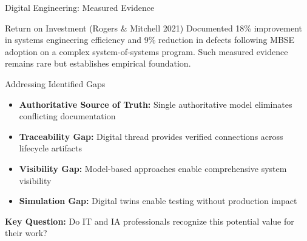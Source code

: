 \documentclass{beamer}
\begin{document}
\begin{frame}[allowframebreaks]{Digital Engineering: Measured Evidence}
  \begin{block}{Return on Investment (Rogers \& Mitchell 2021)}
    Documented 18\% improvement in systems engineering efficiency and 9\% reduction in defects following MBSE adoption on a complex system-of-systems program. Such measured evidence remains rare but establishes empirical foundation.
  \end{block}

  \begin{block}{Addressing Identified Gaps}
    \begin{itemize}
      \item \textbf{Authoritative Source of Truth:} Single authoritative model eliminates conflicting documentation
      \item \textbf{Traceability Gap:} Digital thread provides verified connections across lifecycle artifacts
      \item \textbf{Visibility Gap:} Model-based approaches enable comprehensive system visibility
      \item \textbf{Simulation Gap:} Digital twins enable testing without production impact
    \end{itemize}
  \end{block}

  \vspace{0.2cm}
  \textbf{Key Question:} Do IT and IA professionals recognize this potential value for their work?
\end{frame}
\end{document}
